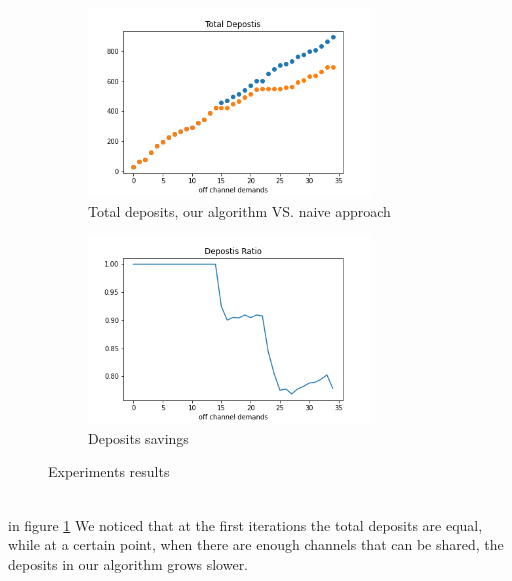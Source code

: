 \documentclass{cup-ino}
\begin{document}
\begin{figure}[h]
\begin{subfigure}{0.5\textwidth}
\includegraphics[width=1\linewidth, height=5cm]{exp10(1).png} 
\caption{Total deposits, our algorithm VS. naive approach}
\label{fig:total_deposits}
\end{subfigure}
\begin{subfigure}{0.5\textwidth}
\includegraphics[width=1\linewidth, height=5cm]{exp11.png}
\caption{Deposits savings}
\label{fig:deposits_davings}
\end{subfigure}
\caption{Experiments results}
\label{fig:results}
\end{figure}

\\
in figure \ref{fig:total_deposits} We noticed that at the first iterations the total deposits are equal, while at a certain point, when there are enough channels that can be shared, the deposits in our algorithm grows slower.

\newpage
\end{document}
